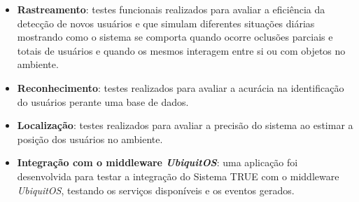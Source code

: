 	\begin{itemize}
		\item \textbf{Rastreamento}: testes funcionais realizados para avaliar a eficiência da detecção de novos usuários e que simulam diferentes situações diárias mostrando como o sistema se comporta quando ocorre oclusões parciais e totais de usuários e quando os mesmos interagem entre si ou com objetos no ambiente.

		\item \textbf{Reconhecimento}: testes realizados para avaliar a acurácia na identificação do usuários perante uma base de dados.


		\item \textbf{Localização}: testes realizados para avaliar a precisão do sistema ao estimar a posição dos usuários no ambiente.

		\item \textbf{Integração com o middleware \textit{UbiquitOS}}: uma aplicação foi desenvolvida para testar a integração do Sistema TRUE com o middleware \textit{UbiquitOS}, testando os serviços disponíveis e os eventos gerados.

	\end{itemize}



















